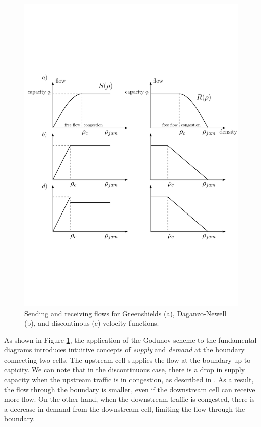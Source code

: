 \begin{figure}[ht]
  \centering
    \includegraphics[width=12cm]{fundamentalDiagramSR.pdf}
    \caption{Sending and receiving flows for Greenshields (a), Daganzo-Newell (b), and discontinous (c) velocity functions.}
    \label{fig:fundamentalDiagramSR}
\end{figure}

\noindent As shown in Figure \ref{fig:fundamentalDiagramSR}, the application of the Godunov scheme to the fundamental diagrams introduces intuitive concepts of \textit{supply} and \textit{demand} at the boundary connecting two cells. The upstream cell supplies the flow at the boundary up to capicity. We can note that in the discontinuous case, there is a drop in supply capacity when the upstream traffic is in congestion, as described in \cite{Agyemang-Duah1991,Cassidy1999,Hall1991}. As a result, the flow through the boundary is smaller, even if the downstream cell can receive more flow. On the other hand, when the downstream traffic is congested, there is a decrease in demand from the downstream cell, limiting the flow through the boundary.

